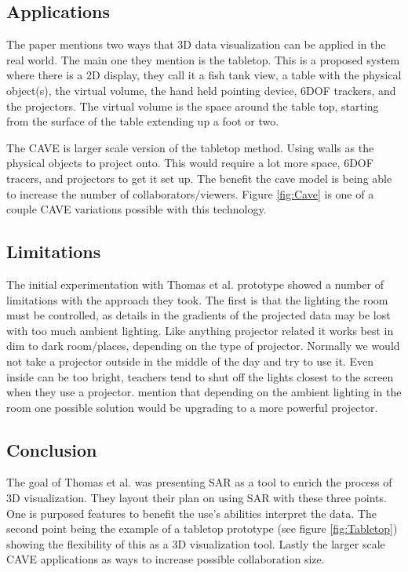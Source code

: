 \documentclass{sig-alternate}
\begin{document}
\subsection{Applications}
\label{sec:Applications}

The paper mentions two ways that 3D data visualization can be applied in the real world. The main one they mention is the tabletop. This is a proposed system where there is a 2D display, they call it a fish tank view, a table with the physical object(s), the virtual volume, the hand held pointing device, 6DOF trackers, and the projectors. The virtual volume is the space around the table top, starting from the surface of the table extending up a foot or two. 

The CAVE is larger scale version of the tabletop method. Using walls as the physical objects to project onto. This would require a lot more space, 6DOF tracers, and projectors to get it set up. The benefit the cave model is being able to increase the number of collaborators/viewers. Figure \ref{fig:Cave} is one of a couple CAVE variations possible with this technology.

\subsection{Limitations}
\label{sec:Limitations}

The initial experimentation with Thomas et al. \cite{3D} prototype showed a number of limitations with the approach they took. The first is that the lighting the room must be controlled, as details in the gradients of the projected data may be lost with too much ambient lighting. Like anything projector related it works best in dim to dark room/places, depending on the type of projector. Normally we would not take a projector outside in the middle of the day and try to use it. Even inside can be too bright, teachers tend to shut off the lights closest to the screen when they use a projector. \cite{3D} mention that depending on the ambient lighting in the room one possible solution would be upgrading to a more powerful projector.

\subsection{Conclusion}
\label{sec:Conclusion}

The goal of Thomas et al. \cite{3D} was presenting SAR as a tool to enrich the process of 3D visualization. They layout their plan on using SAR with these three points. One is purposed features to benefit the use's abilities interpret the data. The second point being the example of a tabletop prototype (see figure \ref{fig:Tabletop}) showing the flexibility of this as a 3D visualization tool. Lastly the larger scale CAVE applications as ways to increase possible collaboration size.      
\end{document}
